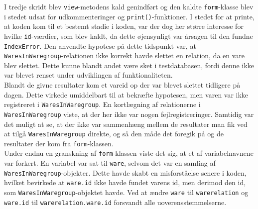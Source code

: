 \documentclass[]{article}
\begin{document}
\indent I tredje skridt blev \texttt{view}-metodens kald genindført og den kaldte \texttt{form}-klasse blev i stedet udsat for udkommenteringer og \texttt{print()}-funktioner. I stedet for at printe, at koden kom til et bestemt stadie i koden, var der dog her større interesse for hvilke \texttt{id}-værdier, som blev kaldt, da dette øjensynligt var årsagen til den fundne \texttt{IndexError}. Den anvendte hypotese på dette tidspunkt var, at \texttt{WaresInWaregroup}-relationen ikke korrekt havde slettet en relation, da en vare blev slettet. Dette kunne blandt andet være sket i testdatabasen, fordi denne ikke var blevet renset under udviklingen af funktionaliteten.  \\
\indent Blandt de givne resultater kom et vareid op der var blevet slettet tidligere på dagen. Dette virkede umiddelbart til at bekræfte hypotesen, men varen var ikke registreret i \texttt{WaresInWaregroup}. En kortlægning af relationerne i \texttt{WaresInWaregroup} viste, at der her ikke var nogen fejlregistreringer. Samtidig var det muligt at se, at der ikke var sammenhæng mellem de resultater man fik ved at tilgå \texttt{WaresInWaregroup} direkte, og så den måde det foregik på og de resultater der kom fra \texttt{form}-klassen.\\
\indent Under endnu en granskning af \texttt{form}-klassen viste det sig, at et af variabelnavnene var forkert. En variabel var sat til \texttt{ware}, selvom det var en samling af \texttt{WaresInWaregroup}-objekter. Dette havde skabt en misforståelse senere i koden, hvilket bevirkede at \texttt{ware.id} ikke havde fundet varens id, men derimod den id, som \texttt{WaresInWaregroup}-objektet havde. Ved at ændre \texttt{ware} til \texttt{warerelation} og \texttt{ware.id} til \texttt{warerelation.ware.id} forsvandt alle uoverensstemmelserne. 

\pagebreak[3]
\end{document}
